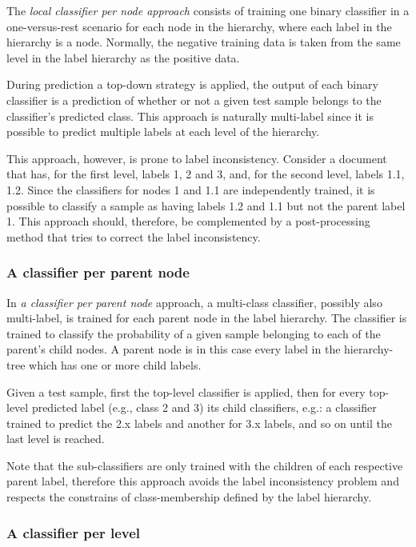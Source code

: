 \documentclass[11pt,a4paper]{article}
\begin{document}
The \textit{local classifier per node approach} consists of training one binary
classifier in a one-versus-rest scenario for each node in the hierarchy, where
each label in the hierarchy is a node. Normally, the negative training data is
taken from the same level in the label hierarchy as the positive data.

During prediction a top-down strategy is applied, the output of each binary
classifier is a prediction of whether or not a given test sample belongs to the
classifier’s predicted class. This approach is naturally multi-label since it is
possible to predict multiple labels at each level of the hierarchy.

This approach, however, is prone to label inconsistency. Consider a document
that has, for the first level, labels 1, 2 and 3, and, for the second level,
labels 1.1, 1.2. Since the classifiers for nodes 1 and 1.1 are independently
trained, it is possible to classify a sample as having labels 1.2 and 1.1 but
not the parent label 1. This approach should, therefore, be complemented by a
post-processing method that tries to correct the label inconsistency.


\subsubsection{A classifier per parent node}

In \textit{a classifier per parent node} approach, a multi-class classifier,
possibly also multi-label, is trained for each parent node in the label
hierarchy. The classifier is trained to classify the probability of a given
sample belonging to each of the parent's child nodes. A parent node is in this
case every label in the hierarchy-tree which has one or more child labels.

Given a test sample, first the top-level classifier is applied, then for every
top-level predicted label (e.g., class 2 and 3) its child classifiers, e.g.: a
classifier trained to predict the 2.x labels and another for 3.x labels, and so
on until the last level is reached.

Note that the sub-classifiers are only trained with the children of each
respective parent label, therefore this approach avoids the label inconsistency
problem and respects the constrains of class-membership defined by the label
hierarchy.


\subsubsection{A classifier per level}
\end{document}
